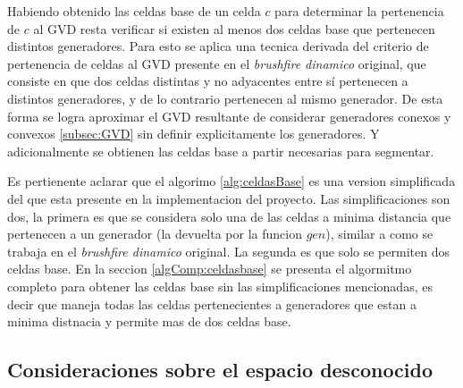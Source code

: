 
Habiendo obtenido las celdas base de un celda $c$ para determinar la
pertenencia de $c$ al GVD resta verificar si existen al menos dos celdas base
que pertenecen distintos generadores. Para esto se aplica una tecnica derivada
del criterio de pertenencia de celdas al GVD presente en el \emph{brushfire dinamico}
original, que consiste en que dos celdas distintas y no adyacentes entre
sí pertenecen a distintos generadores, y de lo contrario pertenecen al mismo
generador. De esta forma se logra aproximar el GVD resultante de considerar
generadores conexos y convexos \ref{subsec:GVD} sin definir explicitamente los
generadores. Y adicionalmente se obtienen las celdas base a partir necesarias
para segmentar.

Es pertienente aclarar que el algorimo \ref{alg:celdasBase} es una version
simplificada del que esta presente en la implementacion del proyecto. Las
simplificaciones son dos, la primera es que se considera solo una de las celdas
a minima distancia que pertenecen a un generador (la devuelta por la funcion
$gen$), similar a como se trabaja en el \emph{brushfire dinamico} original. La
segunda es que solo se permiten dos celdas base. En la seccion
\ref{algComp:celdasbase} se presenta el algormitmo completo para obtener las
celdas base sin las simplificaciones mencionadas, es decir que maneja todas las
celdas pertenecientes a generadores que estan a minima distnacia y permite mas
de dos celdas base.



\subsection{Consideraciones sobre el espacio desconocido}\label{subsec:espDesc}



